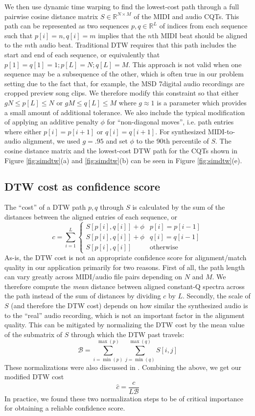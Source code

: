 \documentclass{article}
\begin{document}
We then use dynamic time warping to find the lowest-cost path through a full pairwise cosine distance matrix $S \in \mathbb{R}^{N \times M}$ of the MIDI and audio CQTs.
This path can be represented as two sequences $p, q \in \mathbb{R}^L$ of indices from each sequence such that $p[i] = n, q[i] = m$ implies that the $n$th MIDI beat should be aligned to the $m$th audio beat.
Traditional DTW requires that this path includes the start and end of each sequence, or equivalently that $p[1] = q[1] = 1; p[L] = N; q[L] = M$.
This approach is not valid when one sequence may be a subsequence of the other, which is often true in our problem setting due to the fact that, for example, the MSD 7digital audio recordings are cropped preview song clips.
We therefore modify this constraint so that either $gN \le p[L] \le N$ or $gM \le q[L] \le M$ where $g \approx 1$ is a parameter which provides a small amount of additional tolerance.
We also include the typical modification of applying an additive penalty $\phi$ for ``non-diagonal moves'', i.e. path entries where either $p[i] = p[i + 1]$ or $q[i] = q[i + 1]$.
For synthesized MIDI-to-audio alignment, we used $g = .95$ and set $\phi$ to the 90th percentile of $S$.
The cosine distance matrix and the lowest-cost DTW path for the CQTs shown in Figure \ref{fig:simdtw}(a) and \ref{fig:simdtw}(b) can be seen in Figure \ref{fig:simdtw}(e).

\subsection{DTW cost as confidence score}

The ``cost'' of a DTW path $p, q$ through $S$ is calculated by the sum of the distances between the aligned entries of each sequence, or
$$
c = \sum_{i = 1}^L \begin{cases}
  S[p[i], q[i]] + \phi & p[i] = p[i - 1] \\
  S[p[i], q[i]] + \phi & q[i] = q[i - 1] \\
  S[p[i], q[i]] & \mathrm{otherwise}
\end{cases}
$$
As-is, the DTW cost is not an appropriate confidence score for alignment/match quality in our application primarily for two reasons.
First of all, the path length can vary greatly across MIDI/audio file pairs depending on $N$ and $M$.
We therefore compute the \textit{mean} distance between aligned constant-Q spectra across the path instead of the sum of distances by dividing $c$ by $L$.
Secondly, the scale of $S$ (and therefore the DTW cost) depends on how similar the synthesized audio is to the ``real'' audio recording, which is not an important factor in the alignment quality.
This can be mitigated by normalizing the DTW cost by the mean value of the submatrix of $S$ through which the DTW past travels:
$$
\mathcal{B} = \sum_{i = \min(p)}^{\max(p)} \sum_{j = \min(q)}^{\max(q)} S[i, j] 
$$
These normalizations were also discussed in \cite{hu2003polyphonic}.
Combining the above, we get our modified DTW cost 
$$
\hat{c} = \frac{c}{L\mathcal{B}}
$$
In practice, we found these two normalization steps to be of critical importance for obtaining a reliable confidence score.
\end{document}
